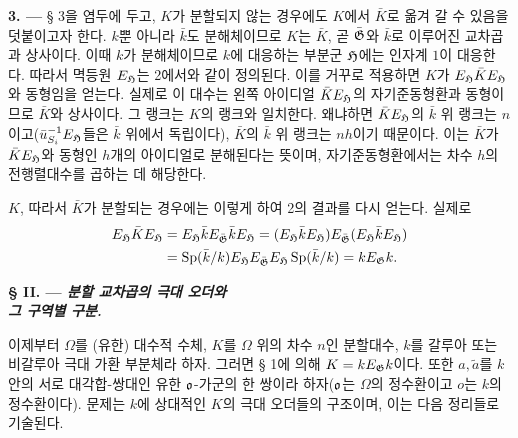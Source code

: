 \medskip
\noindent\textbf{3. ---} § 3을 염두에 두고, $K$가 분할되지 않는 경우에도 $K$에서 $\bar K$로 옮겨 갈 수 있음을 덧붙이고자 한다. $k$뿐 아니라 $\bar k$도 분해체이므로 $K$는 $\bar K$, 곧 $\bar{\mathfrak G}$와 $\bar k$로 이루어진 교차곱과 상사이다. 이때 $k$가 분해체이므로 $k$에 대응하는 부분군 $\mathfrak H$에는 인자계 $1$이 대응한다. 따라서 멱등원 $E_\mathfrak H$는 2에서와 같이 정의된다. 이를 거꾸로 적용하면 $K$가 $E_\mathfrak H\bar K E_\mathfrak H$와 동형임을 얻는다. 실제로 이 대수는 왼쪽 아이디얼 $\bar K E_\mathfrak H$의 자기준동형환과 동형이므로 $\bar K$와 상사이다. 그 랭크는 $K$의 랭크와 일치한다. 왜냐하면 $\bar K E_\mathfrak H$의 $\bar k$ 위 랭크는 $n$이고($\bar u_{S_i}^{-1}E_\mathfrak H$들은 $\bar k$ 위에서 독립이다), $\bar K$의 $\bar k$ 위 랭크는 $nh$이기 때문이다. 이는 $\bar K$가 $\bar K E_\mathfrak H$와 동형인 $h$개의 아이디얼로 분해된다는 뜻이며, 자기준동형환에서는 차수 $h$의 전행렬대수를 곱하는 데 해당한다.

$K$, 따라서 $\bar K$가 분할되는 경우에는 이렇게 하여 2의 결과를 다시 얻는다. 실제로
\[
\begin{aligned}
E_\mathfrak H\bar K E_\mathfrak H
 &=E_\mathfrak H\bar kE_{\bar{\mathfrak G}}\bar kE_\mathfrak H
 =(E_\mathfrak H\bar kE_\mathfrak H)E_{\bar{\mathfrak G}}(E_\mathfrak H\bar kE_\mathfrak H)\\
 &=\operatorname{Sp}(\bar k/k)E_\mathfrak H E_{\bar{\mathfrak G}}E_\mathfrak H\operatorname{Sp}(\bar k/k)
 =kE_\mathfrak G k.
\end{aligned}
\]

\begin{center}
\textbf{§ II. --- \emph{분할 교차곱의 극대 오더와\\
그 구역별 구분.}}
\end{center}

이제부터 $\Omega$를 (유한) 대수적 수체, $K$를 $\Omega$ 위의 차수 $n$인 분할대수, $k$를 갈루아 또는 비갈루아 극대 가환 부분체라 하자. 그러면 § 1에 의해 $K=kE_\mathfrak G k$이다. 또한 $a,\widetilde a$를 $k$ 안의 서로 대각합-쌍대인 유한 $\mathfrak o$-가군의 한 쌍이라 하자($\mathfrak o$는 $\Omega$의 정수환이고 $o$는 $k$의 정수환이다). 문제는 $k$에 상대적인 $K$의 극대 오더들의 구조이며, 이는 다음 정리들로 기술된다.

